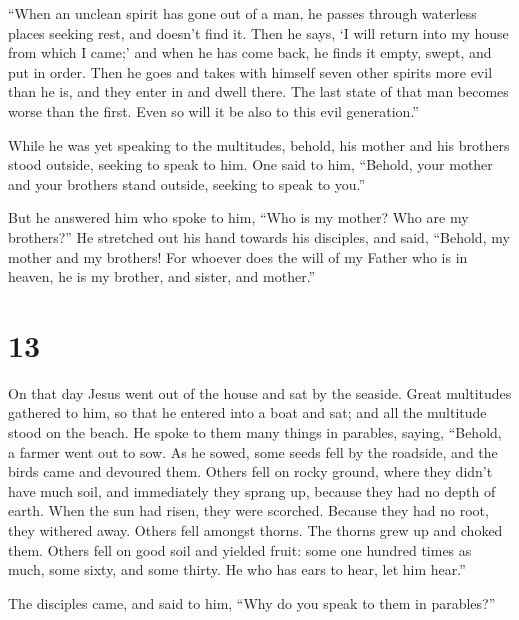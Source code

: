  ``When an unclean spirit has gone out of a man, he
passes through waterless places seeking rest, and doesn't find it.
 Then he says, `I will return into my house from which I
came;' and when he has come back, he finds it empty, swept, and put in
order.  Then he goes and takes with himself seven other
spirits more evil than he is, and they enter in and dwell there. The
last state of that man becomes worse than the first. Even so will it be
also to this evil generation.''

 While he was yet speaking to the multitudes, behold, his
mother and his brothers stood outside, seeking to speak to him.
 One said to him, ``Behold, your mother and your brothers
stand outside, seeking to speak to you.''

 But he answered him who spoke to him, ``Who is my
mother? Who are my brothers?''  He stretched out his hand
towards his disciples, and said, ``Behold, my mother and my brothers!
 For whoever does the will of my Father who is in heaven,
he is my brother, and sister, and mother.''

\hypertarget{section-12}{%
\section{13}\label{section-12}}

 On that day Jesus went out of the house and sat by the
seaside.  Great multitudes gathered to him, so that he
entered into a boat and sat; and all the multitude stood on the beach.
 He spoke to them many things in parables, saying,
``Behold, a farmer went out to sow.  As he sowed, some
seeds fell by the roadside, and the birds came and devoured them.
 Others fell on rocky ground, where they didn't have much
soil, and immediately they sprang up, because they had no depth of
earth.  When the sun had risen, they were scorched.
Because they had no root, they withered away.  Others fell
amongst thorns. The thorns grew up and choked them. 
Others fell on good soil and yielded fruit: some one hundred times as
much, some sixty, and some thirty.  He who has ears to
hear, let him hear.''

 The disciples came, and said to him, ``Why do you speak
to them in parables?''

